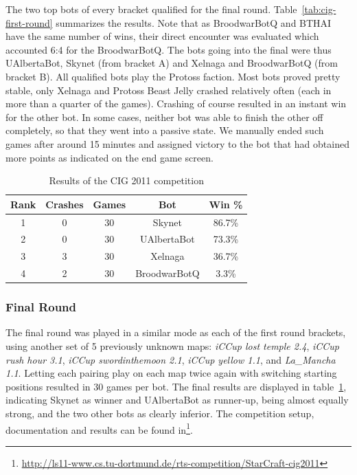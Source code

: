 \documentclass{llncs}
\begin{document}
The two top bots of every bracket qualified
for the final round. Table~\ref{tab:cig-first-round} summarizes
the results.
Note that as BroodwarBotQ and BTHAI have the same number of wins,
their direct encounter was evaluated which accounted 6:4 for the BroodwarBotQ.
The bots going into the final were thus UAlbertaBot, Skynet (from bracket A)
and Xelnaga and BroodwarBotQ (from bracket B). All qualified bots play the
Protoss faction. Most bots proved pretty stable, only Xelnaga and Protoss 
Beast Jelly crashed relatively often (each in more than a quarter of the games). 
Crashing of course resulted in an instant win for the other bot.
In some cases, neither bot was able to finish the other off completely,
so that they went into a passive state. We manually ended such games after
around 15 minutes and assigned victory to the bot that had obtained more
points as indicated on the end game screen.

\begin{table}[!b]
\caption{Results of the CIG 2011 competition}
\label{tab:cig-final-round}
\centering
\begin{tabular}{|c|c|c|c|c|}
\hline
{\bfseries Rank} & {\bfseries Crashes} & {\bfseries Games} & {\bfseries Bot} & {\bfseries Win \%} \\
\hline
1 & 0 &  30 &  Skynet       &  86.7\%\\
2 & 0 &  30 &  UAlbertaBot  &  73.3\%\\
3 & 3 &  30 &  Xelnaga      &  36.7\%\\
4 & 2 &  30 &  BroodwarBotQ   &  3.3\%\\
\hline
\end{tabular}
\end{table}



\subsubsection{Final Round}
\label{sec:cig-final-round}

The final round was played in a similar mode as each of the
first round brackets,
using another set of 5 previously unknown maps:
\emph{iCCup lost temple 2.4}, \emph{iCCup rush hour 3.1},
\emph{iCCup swordinthemoon 2.1}, \emph{iCCup yellow 1.1},
and \emph{La\_Mancha 1.1}. 
Letting each pairing play on each map twice again with
switching starting positions resulted in 30 games per bot.
The final results are displayed in table~\ref{tab:cig-final-round},
indicating Skynet as winner and UAlbertaBot as runner-up, being
almost equally strong, and the two other bots as clearly inferior.
The competition setup, documentation and results can be found
in\footnote{\url{http://ls11-www.cs.tu-dortmund.de/rts-competition/StarCraft-cig2011}}.
\end{document}
